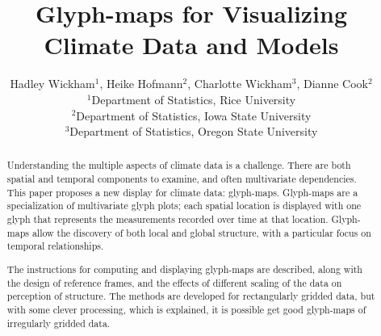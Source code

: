 \documentclass[oneside]{article}
\begin{document}
\title{Glyph-maps for Visualizing Climate Data and Models}
\author{Hadley Wickham$^1$, Heike Hofmann$^2$, Charlotte Wickham$^3$, Dianne Cook$^2$\\
$^1$Department of Statistics, Rice University\\
$^2$Department of Statistics, Iowa State University\\
$^3$Department of Statistics, Oregon State University}
\date{}




%
%
\maketitle

\begin{abstract}

Understanding the multiple aspects of climate data is a challenge. There are both spatial and temporal components to examine, and often multivariate dependencies. This paper proposes a new display for climate data: glyph-maps. Glyph-maps are a specialization of multivariate glyph plots; each spatial location is displayed with one glyph that represents the measurements recorded over time at that location. Glyph-maps allow the discovery of both local and global structure, with a particular focus on temporal relationships.

The instructions for computing and displaying glyph-maps are described, along with the design of reference frames, and the effects of different scaling of the data on perception of structure. The methods are developed for rectangularly gridded data, but with some clever processing, which is explained, it is possible get good glyph-maps of irregularly gridded data.

\end{abstract}
\end{document}
